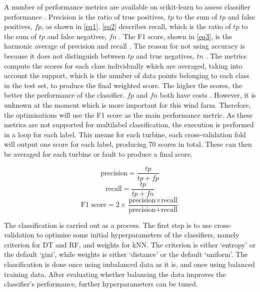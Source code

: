 A number of performance metrics are available on scikit-learn to assess
classifier performance \cite{33M}. Precision is the ratio of true positives,
\ensuremath{tp} to the sum of \ensuremath{tp} and false positives,
\ensuremath{fp}, as shown in \eqref{eq1}. \eqref{eq2} describes recall, which
is the ratio of \ensuremath{tp} to the sum of \ensuremath{tp} and false
negatives, \ensuremath{fn} \cite{deRu15}. The F1 score, shown in \eqref{eq3},
is the harmonic average of precision and recall \cite{Perfo}. The reason for
not using accuracy is because it does not distinguish between \ensuremath{tp}
and true negatives, \ensuremath{tn} \cite{Perfo,SASH}. The metrics compute the
scores for each class individually which are averaged, taking into account the
support, which is the number of data points belonging to each class in the
test set, to produce the final weighted score. The higher the scores, the
better the performance of the classifier. \ensuremath{fp} and \ensuremath{fn}
both have costs \cite{Perfo}. However, it is unknown at the moment which is
more important for this wind farm. Therefore, the optimisations will use the
F1 score as the main performance metric. As these metrics are not supported
for multilabel classification, the execution is performed in a loop for each
label. This means for each turbine, each cross-validation fold will output one
score for each label, producing 70 scores in total. These can then be averaged
for each turbine or fault to produce a final score.

\begin{equation}
  \label{eq1}
  \textrm{precision} = \frac{tp}{tp + fp}
\end{equation}
\begin{equation}
  \label{eq2}
  \textrm{recall} = \frac{tp}{tp + fn}
\end{equation}
\begin{equation}
  \label{eq3}
  \textrm{F1~score} = 2 \times \frac{\textrm{precision} \times \textrm{recall}}{\textrm{precision} + \textrm{recall}}
\end{equation}

The classification is carried out as a process. The first step is to use
cross-validation to optimise some initial hyperparameters of the classifiers,
namely criterion for DT and RF, and weights for kNN. The criterion is either
`entropy' or the default `gini', while weights is either `distance' or the
default `uniform'. The classification is done once using imbalanced data as it
is, and once using balanced training data. After evaluating whether balancing
the data improves the classifier's performance, further hyperparameters can be
tuned.
